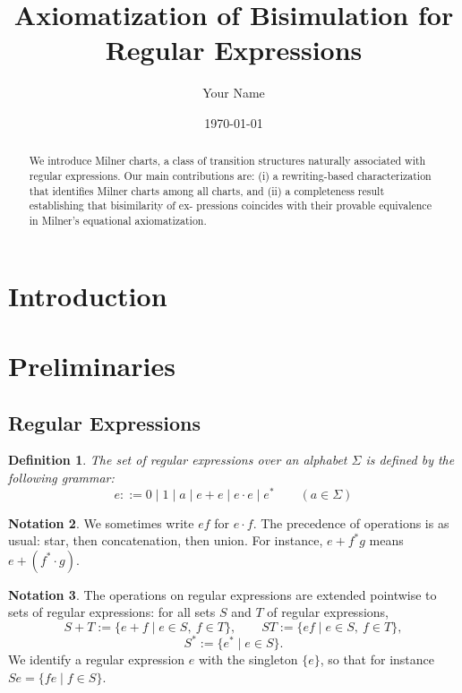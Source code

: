 \documentclass{article}
\newtheorem{definition}{Definition}[section]
\begin{document}
\title{Axiomatization of Bisimulation for Regular Expressions}
\author{Your Name}
\date{\today}
\maketitle  
\begin{abstract}  
  We introduce Milner charts, a class of transition structures naturally
  associated with regular expressions. Our main contributions are: (i) a
  rewriting-based characterization that identifies Milner charts among all
  charts, and (ii) a completeness result establishing that bisimilarity of ex-
  pressions coincides with their provable equivalence in Milner’s equational
  axiomatization.

\end{abstract}
\section{Introduction}

\section{Preliminaries}

\subsection{Regular Expressions}
\begin{definition}
The set of \emph{regular expressions} over an alphabet $\Sigma$ is defined by the following grammar:
\[
e ::= 0 \mid 1 \mid a \mid e + e \mid e\cdot e \mid e^* \qquad (a \in \Sigma)
\]
\end{definition}

\vspace{1em}
\theoremstyle{definition}
\newtheorem{notation}[definition]{Notation}

\begin{notation} 
We sometimes write $ef$ for $e \cdot f$. The precedence of operations is as usual: star, then concatenation, then union. For instance, $e+f^*g$ means $e+(f^*\cdot g)$.
\end{notation}

\begin{notation}
The operations on regular expressions are extended pointwise to sets of regular expressions: for all sets $S$ and $T$ of regular expressions,
\[
S+T:=\{e+f \mid e\in S,\ f\in T\},\qquad
ST:=\{ef \mid e\in S,\ f\in T\},
\]
\[
S^*:=\{e^* \mid e\in S\}.
\]
We identify a regular expression $e$ with the singleton $\{e\}$, so that for instance $Se=\{fe \mid f\in S\}$.
\end{notation}
\vspace{1em}
\end{document}
